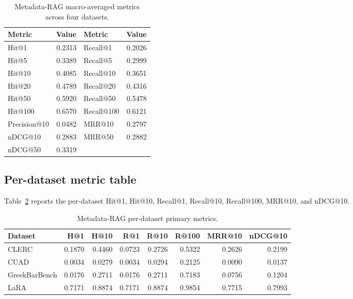 \documentclass[11pt,a4paper]{article}
\begin{document}
\begin{table}[h]
\centering
\caption{Metadata-RAG macro-averaged metrics across four datasets.}
\label{tab:full}
\small
\begin{tabular}{l r | l r}
\toprule
\textbf{Metric} & \textbf{Value}
  & \textbf{Metric} & \textbf{Value} \\
\midrule
Hit@1     & \num{0.2313} & Recall@1   & \num{0.2026} \\
Hit@5     & \num{0.3389} & Recall@5   & \num{0.2999} \\
Hit@10    & \num{0.4085} & Recall@10  & \num{0.3651} \\
Hit@20    & \num{0.4789} & Recall@20  & \num{0.4316} \\
Hit@50    & \num{0.5920} & Recall@50  & \num{0.5478} \\
Hit@100   & \num{0.6570} & Recall@100 & \num{0.6121} \\
Precision@10 & \num{0.0482} & MRR@10  & \num{0.2797} \\
nDCG@10   & \num{0.2883} & MRR@50     & \num{0.2882} \\
nDCG@50   & \num{0.3319} & & \\
\bottomrule
\end{tabular}
\end{table}

\subsection{Per-dataset metric table}
Table~\ref{tab:perds} reports the per-dataset Hit@1, Hit@10, Recall@1,
Recall@10, Recall@100, MRR@10, and nDCG@10.

\begin{table}[h]
\centering
\caption{Metadata-RAG per-dataset primary metrics.}
\label{tab:perds}
\small
\begin{tabular}{l r r r r r r r}
\toprule
\textbf{Dataset} & \textbf{H@1} & \textbf{H@10} & \textbf{R@1}
  & \textbf{R@10} & \textbf{R@100} & \textbf{MRR@10} & \textbf{nDCG@10} \\
\midrule
CLERC              & \num{0.1870} & \num{0.4460}
                   & \num{0.0723} & \num{0.2726}
                   & \num{0.5322} & \num{0.2626} & \num{0.2199} \\
CUAD               & \num{0.0034} & \num{0.0279}
                   & \num{0.0034} & \num{0.0294}
                   & \num{0.2125} & \num{0.0090} & \num{0.0137} \\
GreekBarBench      & \num{0.0176} & \num{0.2711}
                   & \num{0.0176} & \num{0.2711}
                   & \num{0.7183} & \num{0.0756} & \num{0.1204} \\
LaRA               & \num{0.7171} & \num{0.8874}
                   & \num{0.7171} & \num{0.8874}
                   & \num{0.9854} & \num{0.7715} & \num{0.7993} \\
\bottomrule
\end{tabular}
\end{table}
\end{document}
